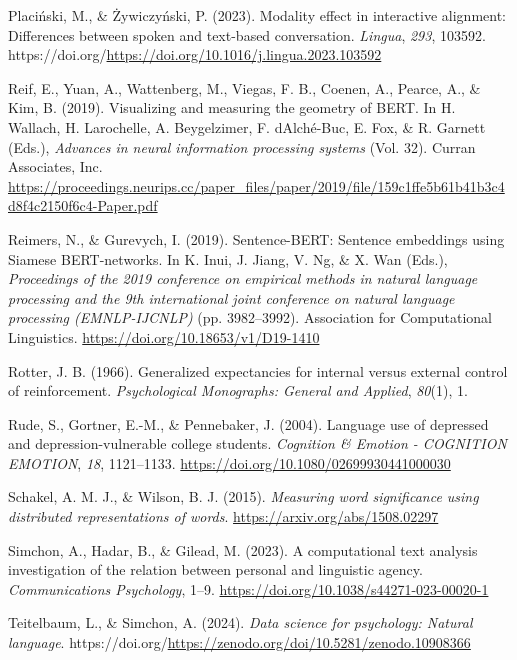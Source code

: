 \documentclass[
  man,
  floatsintext,
  longtable,
  nolmodern,
  notxfonts,
  notimes,
  colorlinks=true,linkcolor=blue,citecolor=blue,urlcolor=blue]{apa7}
\newlength{\cslhangindent}
\newenvironment{CSLReferences}[2] %
 {\begin{list}{}{%
  \setlength{\itemindent}{0pt}
  \setlength{\leftmargin}{0pt}
  \setlength{\parsep}{0pt}
  \ifodd #1
   \setlength{\leftmargin}{\cslhangindent}
   \setlength{\itemindent}{-1\cslhangindent}
  \fi
  \setlength{\itemsep}{#2\baselineskip}}}
 {\end{list}}
\begin{document}
\begin{CSLReferences}{1}{0}
Placiński, M., \& Żywiczyński, P. (2023). Modality effect in interactive
alignment: Differences between spoken and text-based conversation.
\emph{Lingua}, \emph{293}, 103592.
https://doi.org/\url{https://doi.org/10.1016/j.lingua.2023.103592}

Reif, E., Yuan, A., Wattenberg, M., Viegas, F. B., Coenen, A., Pearce,
A., \& Kim, B. (2019). Visualizing and measuring the geometry of BERT.
In H. Wallach, H. Larochelle, A. Beygelzimer, F. dAlché-Buc, E. Fox, \&
R. Garnett (Eds.), \emph{Advances in neural information processing
systems} (Vol. 32). Curran Associates, Inc.
\url{https://proceedings.neurips.cc/paper_files/paper/2019/file/159c1ffe5b61b41b3c4d8f4c2150f6c4-Paper.pdf}

Reimers, N., \& Gurevych, I. (2019). Sentence-{BERT}: Sentence
embeddings using {S}iamese {BERT}-networks. In K. Inui, J. Jiang, V. Ng,
\& X. Wan (Eds.), \emph{Proceedings of the 2019 conference on empirical
methods in natural language processing and the 9th international joint
conference on natural language processing (EMNLP-IJCNLP)} (pp.
3982--3992). Association for Computational Linguistics.
\url{https://doi.org/10.18653/v1/D19-1410}

Rotter, J. B. (1966). Generalized expectancies for internal versus
external control of reinforcement. \emph{Psychological Monographs:
General and Applied}, \emph{80}(1), 1.

Rude, S., Gortner, E.-M., \& Pennebaker, J. (2004). Language use of
depressed and depression-vulnerable college students. \emph{Cognition \&
Emotion - COGNITION EMOTION}, \emph{18}, 1121--1133.
\url{https://doi.org/10.1080/02699930441000030}

Schakel, A. M. J., \& Wilson, B. J. (2015). \emph{Measuring word
significance using distributed representations of words}.
\url{https://arxiv.org/abs/1508.02297}

Simchon, A., Hadar, B., \& Gilead, M. (2023). A computational text
analysis investigation of the relation between personal and linguistic
agency. \emph{Communications Psychology}, 1--9.
\url{https://doi.org/10.1038/s44271-023-00020-1}

Teitelbaum, L., \& Simchon, A. (2024). \emph{Data science for
psychology: Natural language}.
https://doi.org/\url{https://zenodo.org/doi/10.5281/zenodo.10908366}


\end{CSLReferences}
\end{document}
